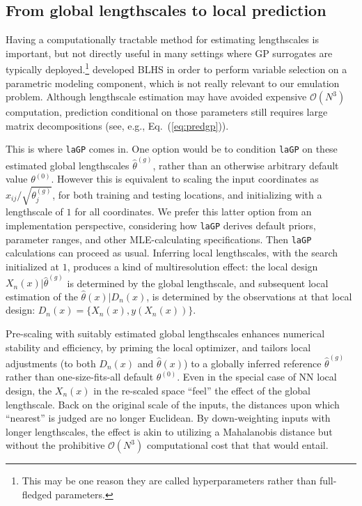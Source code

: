 \documentclass[12pt]{article}
\begin{document}
\subsection{From global lengthscales to local prediction}
\label{sec:gllp}

Having a computationally tractable method for estimating lengthscales is
important, but not directly useful in many settings where GP surrogates are
typically deployed.\footnote{This may be one reason they are called
hyperparameters rather than full-fledged parameters.}  \citet{liu:hung:2015}
developed BLHS in order to perform variable selection on a parametric
modeling component, which is not really relevant to our emulation problem.
Although lengthscale estimation may have avoided expensive $\mathcal{O}(N^3)$
computation, prediction conditional on those parameters still requires large
matrix decompositions (see, e.g., Eq.~(\ref{eq:predgp})).  

This is where {\tt laGP} comes in. One option would be to condition {\tt laGP}
on these estimated global lengthscales $\hat{\theta}^{(g)}$, rather than an
otherwise arbitrary default value $\theta^{(0)}$. However this is equivalent to scaling the
input coordinates as $x_{ij}/\sqrt{\theta_j^{(g)}}$, for both training and testing 
locations, and initializing with a lengthscale of $1$ for all coordinates. 
We prefer this latter option from an implementation perspective, considering
how {\tt laGP} derives default priors, parameter ranges, and other
MLE-calculating specifications.  Then {\tt laGP} calculations can proceed as
usual.  Inferring local lengthscales, with the search initialized at $1$,
produces a kind of multiresolution effect:  the local design $X_n(x) |
\hat{\theta}^{(g)}$ is determined by the global lengthscale, and subsequent
local estimation of the $\hat{\theta}(x) | D_n(x)$, is determined by
the observations at that local design:  $D_n(x) = \{X_n(x), y(X_n(x))\}$. 

Pre-scaling with suitably estimated global
lengthscales enhances numerical stability and efficiency, by priming the local
optimizer, and tailors local adjustments (to both $D_n(x)$ and
$\hat{\theta}(x)$) to a globally inferred reference $\hat{\theta}^{(g)}$
rather than one-size-fits-all default $\theta^{(0)}$.  Even in the special case of
NN local design, the $X_n(x)$ in the re-scaled space ``feel'' the effect of
the global lengthscale. Back on the original scale of the inputs, the
distances upon which ``nearest'' is judged are no longer Euclidean.  By
down-weighting inputs with longer lengthscales, the effect is akin to utilizing
a Mahalanobis distance \citep{bastos:ohagan:2009} but without the prohibitive
$\mathcal{O}(N^3)$ computational cost that that would entail.
\end{document}
